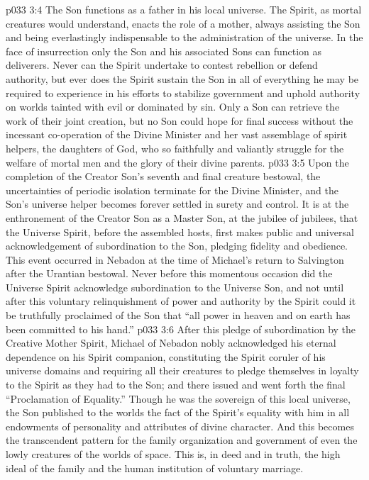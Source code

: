 \vs p033 3:4 \pc The Son functions as a father in his local universe. The Spirit, as mortal creatures would understand, enacts the role of a mother, always assisting the Son and being everlastingly indispensable to the administration of the universe. In the face of insurrection only the Son and his associated Sons can function as deliverers. Never can the Spirit undertake to contest rebellion or defend authority, but ever does the Spirit sustain the Son in all of everything he may be required to experience in his efforts to stabilize government and uphold authority on worlds tainted with evil or dominated by sin. Only a Son can retrieve the work of their joint creation, but no Son could hope for final success without the incessant co\hyp{}operation of the Divine Minister and her vast assemblage of spirit helpers, the daughters of God, who so faithfully and valiantly struggle for the welfare of mortal men and the glory of their divine parents.
\vs p033 3:5 Upon the completion of the Creator Son’s seventh and final creature bestowal, the uncertainties of periodic isolation terminate for the Divine Minister, and the Son’s universe helper becomes forever settled in surety and control. It is at the enthronement of the Creator Son as a Master Son, at the jubilee of jubilees, that the Universe Spirit, before the assembled hosts, first makes public and universal acknowledgement of subordination to the Son, pledging fidelity and obedience. This event occurred in Nebadon at the time of Michael’s return to Salvington after the Urantian bestowal. Never before this momentous occasion did the Universe Spirit acknowledge subordination to the Universe Son, and not until after this voluntary relinquishment of power and authority by the Spirit could it be truthfully proclaimed of the Son that “all power in heaven and on earth has been committed to his hand.”
\vs p033 3:6 After this pledge of subordination by the Creative Mother Spirit, Michael of Nebadon nobly acknowledged his eternal dependence on his Spirit companion, constituting the Spirit coruler of his universe domains and requiring all their creatures to pledge themselves in loyalty to the Spirit as they had to the Son; and there issued and went forth the final “Proclamation of Equality.” Though he was the sovereign of this local universe, the Son published to the worlds the fact of the Spirit’s equality with him in all endowments of personality and attributes of divine character. And this becomes the transcendent pattern for the family organization and government of even the lowly creatures of the worlds of space. This is, in deed and in truth, the high ideal of the family and the human institution of voluntary marriage.
